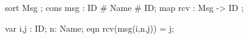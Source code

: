 sort Msg ;
cons msg : ID # Name # ID;
map
   rcv : Msg -> ID ;
   
var 
   i,j : ID;
   n: Name;
eqn 
    rcv(msg(i,n,j)) = j;
